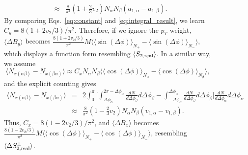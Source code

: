 \begin{figure}[htbp]
\begin{eqnarray}
&\approx& \frac{8}{\pi^2}(1+\frac{2}{3}v_2)N_\alpha N_\beta (a_{1,\alpha}-a_{1,\beta}).  \label{eq:integral_result}  
\end{eqnarray}
By comparing Eqs.~\ref{eq:constant} and \ref{eq:integral_result}, we learn $C_y = 8(1+2v_2/3)/\pi^2$. Therefore,
if we ignore the $p_T$ weight,  $\langle\Delta B_y\rangle$ becomes $\frac{8(1+2v_2/3)}{\pi^2} M \langle\langle \sin(\Delta \phi)\rangle_{N_+} -\langle \sin(\Delta\phi)\rangle_{N_-} \rangle$, which displays a function form resembling $\langle S_{2,\rm real}\rangle$. 
In a similar way,
we assume
\begin{equation}
\langle N_{x(\alpha\beta)}-N_{x(\beta\alpha)} \rangle \approx  C_x N_\alpha N_\beta \langle\langle \cos(\Delta \phi)\rangle _{N_\alpha}-\langle \cos(\Delta\phi)\rangle_{N_\beta} \rangle,  
\end{equation}
and the explicit counting gives
\begin{eqnarray}
\langle N_{x(\alpha\beta)}-N_{x(\beta\alpha)} \rangle &=& 2\int_{0}^{\pi} 
\Big[\int_{\Delta\phi_\alpha}^{2\pi-\Delta\phi_\alpha} \frac{dN}{d\Delta\phi_\beta}d\Delta\phi_\beta-\int^{\Delta\phi_\alpha}_{-\Delta\phi_\alpha} \frac{dN}{d\Delta\phi_\beta}d\Delta\phi_\beta\Big]\frac{dN}{d\Delta\phi_\alpha}d\Delta\phi_\alpha \nonumber \\
&\approx& \frac{8}{\pi^2}(1-\frac{2}{3}v_2)N_\alpha N_\beta (v_{1,\alpha}-v_{1,\beta}).   
\end{eqnarray}
Thus, $C_x = 8(1-2v_2/3)/\pi^2$, and 
$\langle\Delta B_x\rangle$ becomes  $\frac{8(1-2v_2/3)}{\pi^2} M \langle\langle \cos(\Delta \phi)\rangle_{N_+} -\langle \cos(\Delta\phi)\rangle_{N_-} \rangle$, resembling $\langle \Delta S_{2,\rm real}^{\perp}\rangle$. 


\end{figure}
